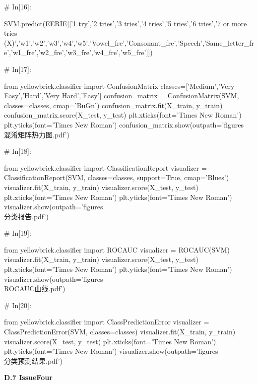 \documentclass{MathModeling}
\begin{document}
\begin{python}
# In[16]:


SVM.predict(EERIE[['1 try','2 tries','3 tries','4 tries','5 tries','6 tries','7 or more tries (X)','w1','w2','w3','w4','w5','Vowel_fre','Consonant_fre','Speech','Same_letter_fre','w1_fre','w2_fre','w3_fre','w4_fre','w5_fre']])


# In[17]:


from yellowbrick.classifier import ConfusionMatrix
classes=['Medium','Very Easy','Hard','Very Hard','Easy']
confusion_matrix = ConfusionMatrix(SVM, classes=classes, cmap='BuGn')
confusion_matrix.fit(X_train, y_train)
confusion_matrix.score(X_test, y_test)
plt.xticks(font='Times New Roman')
plt.yticks(font='Times New Roman')
confusion_matrix.show(outpath='figures\\混淆矩阵热力图.pdf')


# In[18]:


from yellowbrick.classifier import ClassificationReport
visualizer = ClassificationReport(SVM, classes=classes, support=True, cmap='Blues')
visualizer.fit(X_train, y_train)
visualizer.score(X_test, y_test)
plt.xticks(font='Times New Roman')
plt.yticks(font='Times New Roman')
visualizer.show(outpath='figures\\分类报告.pdf')


# In[19]:


from yellowbrick.classifier import ROCAUC
visualizer = ROCAUC(SVM)
visualizer.fit(X_train, y_train)
visualizer.score(X_test, y_test)
plt.xticks(font='Times New Roman')
plt.yticks(font='Times New Roman')
visualizer.show(outpath='figures\\ROCAUC曲线.pdf')


# In[20]:


from yellowbrick.classifier import ClassPredictionError
visualizer = ClassPredictionError(SVM, classes=classes)
visualizer.fit(X_train, y_train)
visualizer.score(X_test, y_test)
plt.xticks(font='Times New Roman')
plt.yticks(font='Times New Roman')
visualizer.show(outpath='figures\\分类预测结果.pdf')


\end{python}
\newpage
\textbf{D.7 IssueFour}
\end{document}
